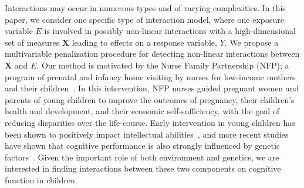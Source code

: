 \documentclass[a4paper,fleqn]{cas-sc}
\newcommand{\mb}[1]{\mathbf{#1}}
\begin{document}
Interactions may occur in numerous types and of varying complexities. 
In this paper, we consider one specific type of interaction model, where one exposure variable $E$ is involved in possibly non-linear interactions with a high-dimensional set of measures $\mb{X}$ leading to effects on a response variable, $Y$. 
We propose a multivariable penalization procedure for detecting non-linear interactions between $\mb{X}$ and $E$. 
Our method is motivated by the Nurse Family Partnership (NFP); a program of prenatal and infancy home visiting by nurses for low-income mothers and their children~\citep{olds1998long}. 
In this intervention, NFP nurses guided pregnant women and parents of young children to improve the outcomes of pregnancy, their children's health and development, and their economic self-sufficiency, with the goal of reducing disparities over the life-course. 
Early intervention in young children has been shown to positively impact intellectual abilities~\citep{campbell1994effects}, and more recent studies have shown that cognitive performance is also strongly influenced by genetic factors~\citep{rietveld2013gwas}. 
Given the important role of both environment and genetics, we are interested in finding interactions between these two components on cognitive function in children. 




\end{document}
